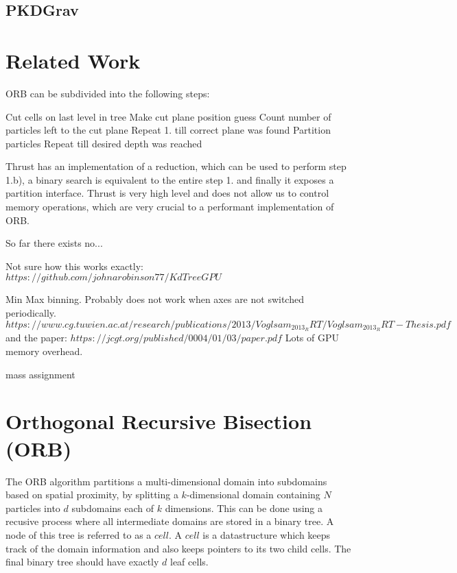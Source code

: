 \documentclass[]{article}
\begin{document}
\subsection{PKDGrav}


\newpage
\section{Related Work}

ORB can be subdivided into the following steps:

\begin{outline}[enumerate]
	\1 Cut cells on last level in tree
	\2 Make cut plane position guess
	\2 Count number of particles left to the cut plane
	\2 Repeat 1. till correct plane was found
	\1 Partition particles
	\1 Repeat till desired depth was reached
\end{outline}

Thrust has an implementation of a reduction, which can be used to perform step 1.b), a binary search is equivalent to the entire step 1. and finally it exposes a partition interface. Thrust is very high level and does not allow us to control memory operations, which are very crucial to a performant implementation of ORB. 

So far there exists no...

Not sure how this works exactly:
$https://github.com/johnarobinson77/KdTreeGPU$

Min Max binning. Probably does not work when axes are not switched periodically.
$https://www.cg.tuwien.ac.at/research/publications/2013/Voglsam_2013_RRT/Voglsam_2013_RRT-Thesis.pdf$
and the paper:
$https://jcgt.org/published/0004/01/03/paper.pdf$ Lots of GPU memory overhead.

mass assignment



\newpage
\section{Orthogonal Recursive Bisection (ORB)} \label{section:orb}


The ORB algorithm partitions a multi-dimensional domain into subdomains based on spatial proximity, by splitting a $k$-dimensional domain containing $N$ particles into $d$ subdomains each of $k$ dimensions. This can be done using a recusive process where all intermediate domains are stored in a binary tree. A node of this tree is referred to as a $cell$. A $cell$ is a datastructure which keeps track of the domain information and also keeps pointers to its two child cells. The final binary tree should have exactly $d$ leaf cells. 
\end{document}
